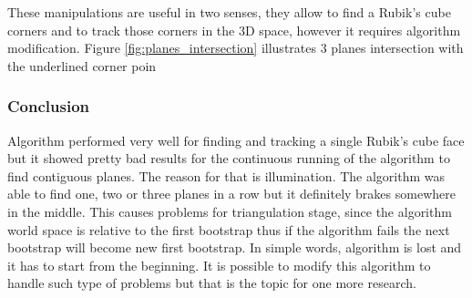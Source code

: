 \documentclass[../../main]{subfiles}
\begin{document}
\newpage

These manipulations are useful in two senses, they allow to find a Rubik's cube corners and to track those corners in the 3D space, however it requires algorithm modification. Figure \ref{fig:planes_intersection} illustrates 3 planes intersection with the underlined corner poin

\subsubsection{Conclusion}

Algorithm performed very well for finding and tracking a single Rubik's cube face but it showed pretty bad results for the continuous running of the algorithm to find contiguous planes. The reason for that is illumination. The algorithm was able to find one, two or three planes in a row but it definitely brakes somewhere in the middle. This causes problems for triangulation stage, since the algorithm world space is relative to the first bootstrap thus if the algorithm fails the next bootstrap will become new first bootstrap. In simple words, algorithm is lost and it has to start from the beginning. It is possible to modify this algorithm to handle such type of problems but that is the topic for one more research.
\end{document}
